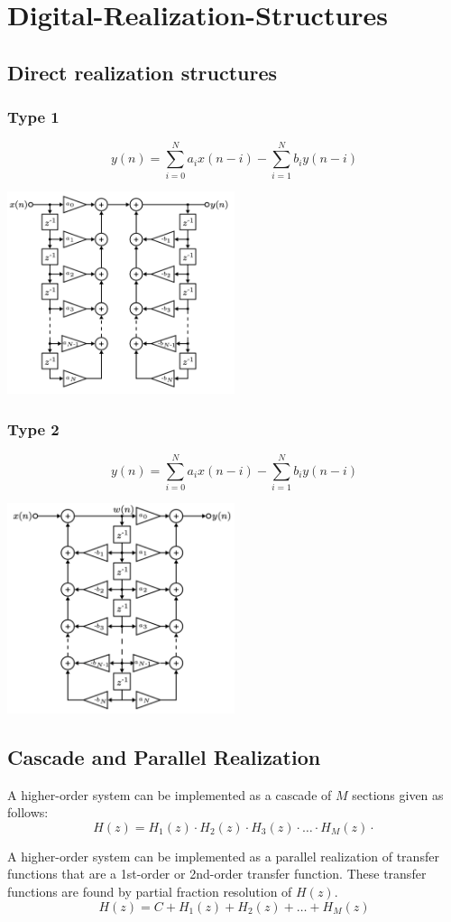 \section{Digital-Realization-Structures}
\subsection{Direct realization structures}
\subsubsection{Type 1}
$$y(n)=\sum_{i=0}^{N}a_{i}x(n-i)-\sum_{i=1}^{N}b_{i}y(n-i)$$
\begin{center}
  \includegraphics[width=0.5\textwidth]{Images/Type-1.png}
\end{center}
\subsubsection{Type 2}
$$y(n)=\sum_{i=0}^{N}a_{i}x(n-i)-\sum_{i=1}^{N}b_{i}y(n-i)$$
\begin{center}
  \includegraphics[width=0.5\textwidth]{Images/Type-2.png}
\end{center}
\subsection{Cascade and Parallel Realization}
A higher-order system can be implemented as a cascade of $M$ sections given as follows:
$$H(z)=H_1(z)\cdot H_2(z)\cdot H_3(z)\cdot \dots \cdot H_M(z)\cdot$$

A higher-order system can be implemented as a parallel realization of transfer functions that are a 1st-order or 2nd-order transfer function. These transfer functions are found by partial fraction resolution of $H(z)$.
$$H(z)=C+H_1(z)+H_2(z)+\dots+H_M(z)$$
